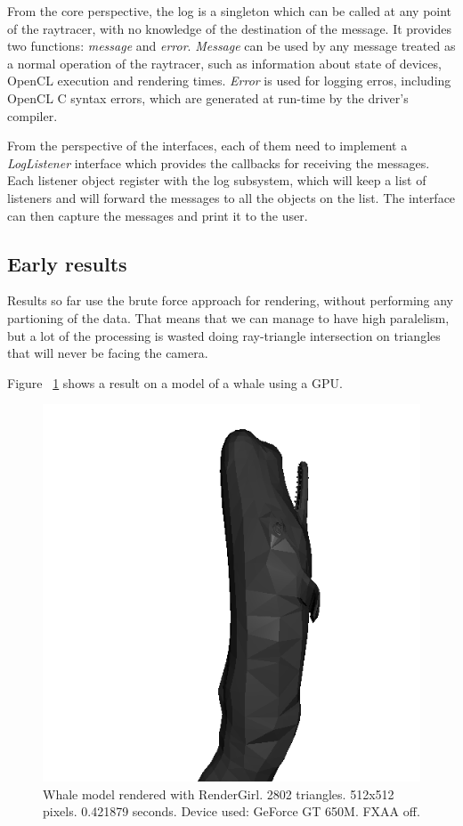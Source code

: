\documentclass[a4paper]{sbgames}               %
\begin{document}
From the core perspective, the log is a singleton which can be called
at any point of the raytracer, with no knowledge of the destination of
the message. It provides two functions: \emph{message} and
\emph{error}. \emph{Message} can be used by any message treated as a normal
operation of the raytracer, such as information about state of
devices, OpenCL execution and rendering times. \emph{Error} is used for
logging erros, including OpenCL C syntax errors, which are generated at
run-time by the driver's compiler.

From the perspective of the interfaces, each of them need to implement
a \emph{LogListener} interface which provides the callbacks for
receiving the messages. Each listener object register with the log
subsystem, which will keep a list of listeners and will forward the
messages to all the objects on the list. The interface can then
capture the messages and print it to the user.

\subsection{Early results}
\label{sec:conclusion}

Results so far use the brute force approach for rendering, without
performing any partioning of the data. That means that we can manage
to have high paralelism, but a lot of the processing is wasted doing
ray-triangle intersection on triangles that will never be facing the
camera.

Figure ~\ref{fig:result1} shows a result on a model of a whale using a
GPU.

\begin{figure}
  \centering
  \includegraphics[width=0.8\linewidth]{render.png}
  \caption{Whale model rendered with RenderGirl. 2802 triangles.
    512x512 pixels. 0.421879 seconds. Device used: GeForce GT 650M. FXAA
    off.}
 \label{fig:result1}
\end{figure}
\end{document}
